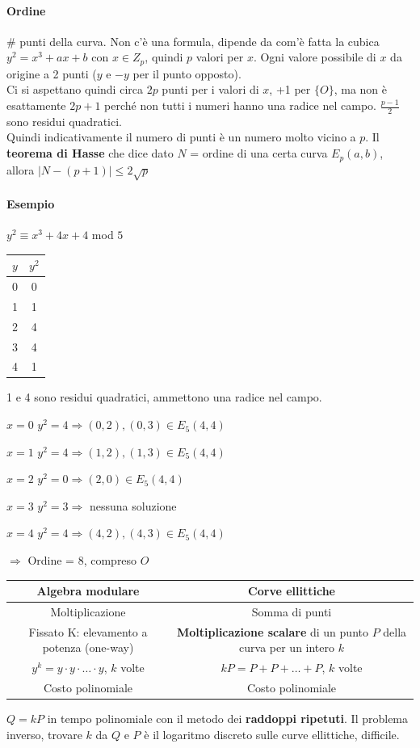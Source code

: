 \documentclass[10pt]{book}
\begin{document}
\paragraph{Ordine} \# punti della curva. Non c'è una formula, dipende da com'è fatta la cubica $y^2 = x^3 + ax + b$ con $x \in Z_p$, quindi $p$ valori per $x$. Ogni valore possibile di $x$ da origine a 2 punti ($y$ e $-y$ per il punto opposto).\\ Ci si aspettano quindi circa $2p$ punti per i valori di $x$, +1 per $\{O\}$, ma non è esattamente $2p + 1$ perché non tutti i numeri hanno una radice nel campo. $\frac{p-1}{2}$ sono residui quadratici.\\
Quindi indicativamente il numero di punti è un numero molto vicino a $p$. Il \textbf{teorema di Hasse} che dice dato $N$ = ordine di una certa curva $E_p(a,b)$, allora $|N - (p+1)|\leq 2\sqrt{p}$
\paragraph{Esempio} $y^2 \equiv x^3 + 4x + 4$ mod $5$\\
\begin{tabular}{c | c}
$y$&$y^2$\\
\hline
0&0\\
1&1\\
2&4\\
3&4\\
4&1
\end{tabular}
1 e 4 sono residui quadratici, ammettono una radice nel campo.
\begin{list}{}{}
	\item[$x= 0$] $y^2 = 4 \Rightarrow (0,2),(0,3)\in E_5(4,4)$
	\item[$x=1$] $y^2 = 4 \Rightarrow (1,2),(1,3) \in E_5(4,4)$
	\item[$x=2$] $y^2 = 0 \Rightarrow (2,0) \in E_5(4,4)$
	\item[$x=3$] $y^2 = 3 \Rightarrow$ nessuna soluzione
	\item[$x=4$] $y^2 = 4 \Rightarrow (4,2), (4,3)\in E_5(4,4)$
	\item[$\Rightarrow$] Ordine = 8, compreso $O$
\end{list}
\begin{center}
\begin{tabular}{c | c}
Algebra modulare & Corve ellittiche\\
\hline
Moltiplicazione & Somma di punti\\
Fissato K: elevamento a potenza (one-way) & \textbf{Moltiplicazione scalare} di un punto $P$ della curva per un intero $k$\\
$y^k = y\cdot y \cdot \ldots \cdot y$, $k$ volte&$kP = P + P + \ldots + P$, $k$ volte\\
Costo polinomiale & Costo polinomiale
\end{tabular}
\end{center}
$Q = kP$ in tempo polinomiale con il metodo dei \textbf{raddoppi ripetuti}. Il problema inverso, trovare $k$ da $Q$ e $P$ è il logaritmo discreto sulle curve ellittiche, difficile.
\pagebreak
\end{document}
